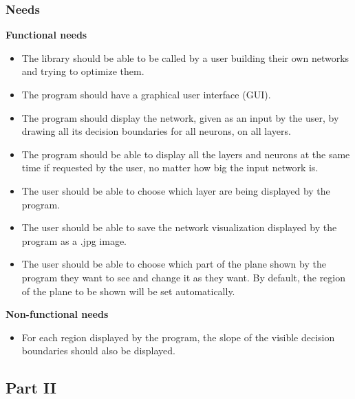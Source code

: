 \documentclass[a4paper]{article}
\begin{document}
\subsubsection{Needs}
\noindent\textbf{Functional needs}
\begin{itemize}
\item The library should be able to be called by a user building their own networks and trying to optimize them.
\item The program should have a graphical user interface (GUI).
\item The program should display the network, given as an input by the user, by drawing all its decision boundaries for all neurons, on all layers. 
\item The program should be able to display all the layers and neurons at the same time if requested by the user, no matter how big the input network is.
\item The user should be able to choose which layer are being displayed by the program. 
\item The user should be able to save the network visualization displayed by the program as a .jpg image.
\item The user should be able to choose which part of the plane shown by the program they want to see and change it as they want. By default, the region of the plane to be shown will be set automatically. 

\end{itemize}
\noindent\textbf{Non-functional needs}
\begin{itemize}
\item For each region displayed by the program, the slope of the visible decision boundaries should also be displayed.
\end{itemize}

\subsection{Part II}
\end{document}
